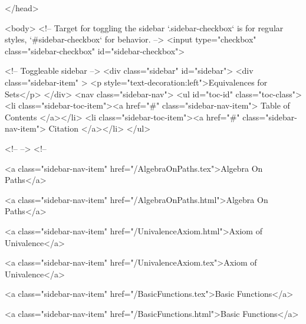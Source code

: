   
</head>




  <body>
    <!-- Target for toggling the sidebar `.sidebar-checkbox` is for regular
     styles, `#sidebar-checkbox` for behavior. -->
<input type="checkbox" class="sidebar-checkbox" id="sidebar-checkbox">

<!-- Toggleable sidebar -->
<div class="sidebar" id="sidebar">
  <div class="sidebar-item" >
    <p style="text-decoration:left">Equivalences for Sets</p>
  </div>
  <nav class="sidebar-nav">
    <ul id="toc-id" class="toc-class">
  <li class="sidebar-toc-item"><a href="#" class="sidebar-nav-item"> Table of Contents </a></li>
  <li class="sidebar-toc-item"><a href="#" class="sidebar-nav-item"> Citation </a></li>
</ul>


    <!--  -->
    <!-- 
      
    
      
    
      
    
      
        
      
    
      
        
          <a class="sidebar-nav-item" href="/AlgebraOnPaths.tex">Algebra On Paths</a>
        
      
    
      
        
          <a class="sidebar-nav-item" href="/AlgebraOnPaths.html">Algebra On Paths</a>
        
      
    
      
        
          <a class="sidebar-nav-item" href="/UnivalenceAxiom.html">Axiom of Univalence</a>
        
      
    
      
        
          <a class="sidebar-nav-item" href="/UnivalenceAxiom.tex">Axiom of Univalence</a>
        
      
    
      
        
          <a class="sidebar-nav-item" href="/BasicFunctions.tex">Basic Functions</a>
        
      
    
      
        
          <a class="sidebar-nav-item" href="/BasicFunctions.html">Basic Functions</a>
        
      
    
      
        
